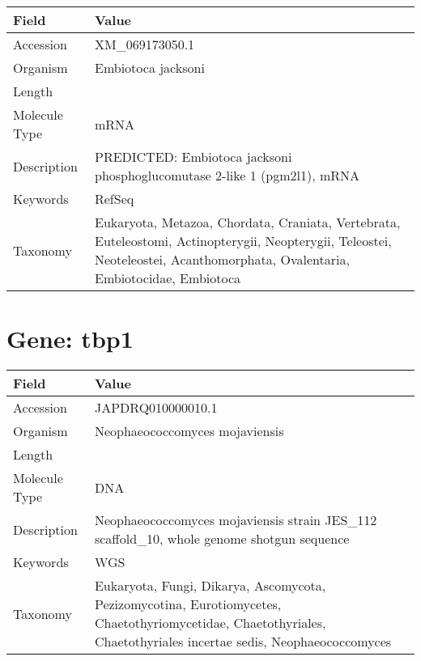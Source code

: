 \documentclass[10pt]{article}
\begin{document}
\vspace{1em}
{\footnotesize
\begin{longtable}{>{\raggedright\arraybackslash}p{4.5cm} >{\raggedright\arraybackslash}p{11.5cm}}
\textbf{Field} & \textbf{Value} \\
\hline
Accession & XM\_069173050.1 \\
Organism & Embiotoca jacksoni \\
Length & 13393 \\
Molecule Type & mRNA \\
Description & PREDICTED: Embiotoca jacksoni phosphoglucomutase 2-like 1 (pgm2l1), mRNA \\
Keywords & RefSeq \\
Taxonomy & Eukaryota, Metazoa, Chordata, Craniata, Vertebrata, Euteleostomi, Actinopterygii, Neopterygii, Teleostei, Neoteleostei, Acanthomorphata, Ovalentaria, Embiotocidae, Embiotoca \\
\end{longtable}
}

\vspace{1em}
\section{Gene: tbp1}
{\footnotesize
\begin{longtable}{>{\raggedright\arraybackslash}p{4.5cm} >{\raggedright\arraybackslash}p{11.5cm}}
\textbf{Field} & \textbf{Value} \\
\hline
Accession & JAPDRQ010000010.1 \\
Organism & Neophaeococcomyces mojaviensis \\
Length & 260712 \\
Molecule Type & DNA \\
Description & Neophaeococcomyces mojaviensis strain JES\_112 scaffold\_10, whole genome shotgun sequence \\
Keywords & WGS \\
Taxonomy & Eukaryota, Fungi, Dikarya, Ascomycota, Pezizomycotina, Eurotiomycetes, Chaetothyriomycetidae, Chaetothyriales, Chaetothyriales incertae sedis, Neophaeococcomyces \\
\end{longtable}
}

\vspace{1em}
\end{document}

